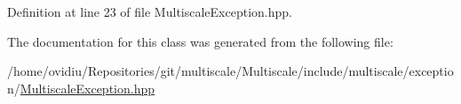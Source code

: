 \-Definition at line 23 of file \-Multiscale\-Exception.\-hpp.



\-The documentation for this class was generated from the following file\-:\begin{DoxyCompactItemize}
\item 
/home/ovidiu/\-Repositories/git/multiscale/\-Multiscale/include/multiscale/exception/\hyperlink{MultiscaleException_8hpp}{\-Multiscale\-Exception.\-hpp}\end{DoxyCompactItemize}
